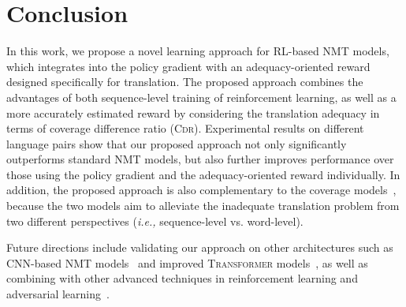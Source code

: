 \documentclass[letterpaper]{article} \usepackage{aaai19}  \usepackage{times}  \usepackage{helvet}  \usepackage{courier}  \usepackage{url}  \usepackage{graphicx}  \frenchspacing  \setlength{\pdfpagewidth}{8.5in}  \setlength{\pdfpageheight}{11in}  \usepackage{amsmath}
\begin{document}
\section{Conclusion}

In this work, we propose a novel learning approach for RL-based NMT models, which integrates into the policy gradient with an adequacy-oriented reward designed specifically for translation. 
The proposed approach combines the advantages of both sequence-level training of reinforcement learning, as well as a more accurately estimated reward by considering the translation adequacy in terms of coverage difference ratio (\textsc{Cdr}).
Experimental results on different language pairs show that our proposed approach not only significantly outperforms standard NMT models, but also further improves performance over those using the policy gradient and the adequacy-oriented reward individually. In addition, the proposed approach is also complementary to the coverage models~\cite{tu2016modeling}, because the two models aim to alleviate the inadequate translation problem from two different perspectives (\emph{i.e.,}\xspace sequence-level vs. word-level).

Future directions include validating our approach on other architectures such as CNN-based NMT models~\cite{gehring2017convolutional} and improved \textsc{Transformer} models~\cite{shaw2018self,Shen:2018:AAAI}, as well as combining with other advanced techniques in reinforcement learning and adversarial learning~\cite{bahdanau2016actor,Yu:2017:AAAI,Yang:2018:NAACL}.





\end{document}

